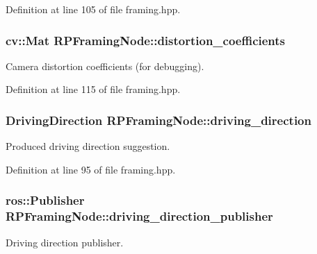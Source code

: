 \-Definition at line 105 of file framing.\-hpp.

\hypertarget{class_r_p_framing_node_a312c193fe5662a8062a4f6d0918962f8}{
\subsubsection[{distortion\-\_\-coefficients}]{\setlength{\rightskip}{0pt plus 5cm}cv\-::\-Mat {\bf \-R\-P\-Framing\-Node\-::distortion\-\_\-coefficients}}}\label{class_r_p_framing_node_a312c193fe5662a8062a4f6d0918962f8}
\-Camera distortion coefficients (for debugging). 

\-Definition at line 115 of file framing.\-hpp.

\hypertarget{class_r_p_framing_node_a6a5e5171d0d882e21e9caee5977917ed}{
\subsubsection[{driving\-\_\-direction}]{\setlength{\rightskip}{0pt plus 5cm}\-Driving\-Direction {\bf \-R\-P\-Framing\-Node\-::driving\-\_\-direction}}}\label{class_r_p_framing_node_a6a5e5171d0d882e21e9caee5977917ed}
\-Produced driving direction suggestion. 

\-Definition at line 95 of file framing.\-hpp.

\hypertarget{class_r_p_framing_node_a790bcf735ba2a573f27be72ad2c0f1b3}{
\subsubsection[{driving\-\_\-direction\-\_\-publisher}]{\setlength{\rightskip}{0pt plus 5cm}ros\-::\-Publisher {\bf \-R\-P\-Framing\-Node\-::driving\-\_\-direction\-\_\-publisher}}}\label{class_r_p_framing_node_a790bcf735ba2a573f27be72ad2c0f1b3}
\-Driving direction publisher. 


